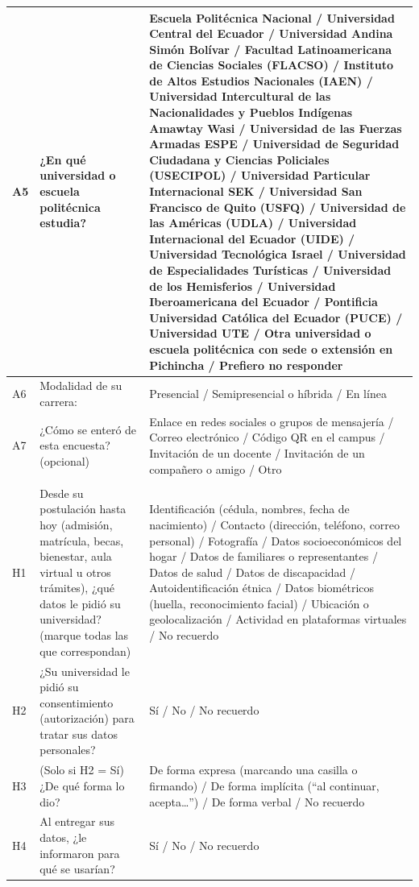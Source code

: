 {\begin{xltabular}{\textwidth}{|>{\raggedright\arraybackslash}p{1.1cm}|>{\raggedright\arraybackslash}X|>{\raggedright\arraybackslash}p{4.6cm}|}
  A5 & ¿En qué universidad o escuela politécnica estudia? & Escuela Politécnica Nacional / Universidad Central del Ecuador / Universidad Andina Simón Bolívar / Facultad Latinoamericana de Ciencias Sociales (FLACSO) / Instituto de Altos Estudios Nacionales (IAEN) / Universidad Intercultural de las Nacionalidades y Pueblos Indígenas Amawtay Wasi / Universidad de las Fuerzas Armadas ESPE / Universidad de Seguridad Ciudadana y Ciencias Policiales (USECIPOL) / Universidad Particular Internacional SEK / Universidad San Francisco de Quito (USFQ) / Universidad de las Américas (UDLA) / Universidad Internacional del Ecuador (UIDE) / Universidad Tecnológica Israel / Universidad de Especialidades Turísticas / Universidad de los Hemisferios / Universidad Iberoamericana del Ecuador / Pontificia Universidad Católica del Ecuador (PUCE) / Universidad UTE / Otra universidad o escuela politécnica con sede o extensión en Pichincha / Prefiero no responder \\ \hline
  A6 & Modalidad de su carrera: & Presencial / Semipresencial o híbrida / En línea \\ \hline
  A7 & ¿Cómo se enteró de esta encuesta? (opcional) & Enlace en redes sociales o grupos de mensajería / Correo electrónico / Código QR en el campus / Invitación de un docente / Invitación de un compañero o amigo / Otro \\ \hline
   \\ \hline
  H1 & Desde su postulación hasta hoy (admisión, matrícula, becas, bienestar, aula virtual u otros trámites), ¿qué datos le pidió su universidad? (marque todas las que correspondan) & Identificación (cédula, nombres, fecha de nacimiento) / Contacto (dirección, teléfono, correo personal) / Fotografía / Datos socioeconómicos del hogar / Datos de familiares o representantes / Datos de salud / Datos de discapacidad / Autoidentificación étnica / Datos biométricos (huella, reconocimiento facial) / Ubicación o geolocalización / Actividad en plataformas virtuales / No recuerdo \\ \hline
  H2 & ¿Su universidad le pidió su consentimiento (autorización) para tratar sus datos personales? & Sí / No / No recuerdo \\ \hline
  H3 & (Solo si H2 = Sí) ¿De qué forma lo dio? & De forma expresa (marcando una casilla o firmando) / De forma implícita (\textquotedblleft{}al continuar, acepta\ldots\textquotedblright{}) / De forma verbal / No recuerdo \\ \hline
  H4 & Al entregar sus datos, ¿le informaron para qué se usarían? & Sí / No / No recuerdo \\ \hline

\end{xltabular}}

